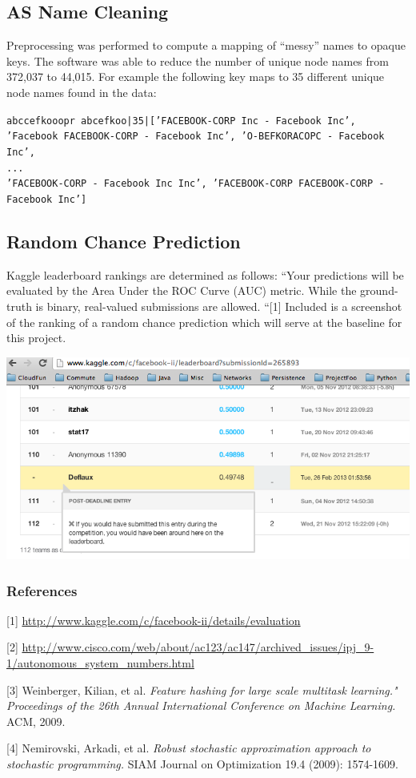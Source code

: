 \documentclass{article} %
\begin{document}
\subsection{AS Name Cleaning}

Preprocessing was performed to compute a mapping of ``messy'' names to opaque
keys.  The software was able to reduce the number of unique node names from
372,037 to 44,015. For example the following key maps to 35 different unique node names
found in the data:

{\small \texttt{abccefkooopr abcefkoo|35|['FACEBOOK-CORP Inc - Facebook
    Inc', 'Facebook FACEBOOK-CORP - Facebook Inc', 'O-BEFKORACOPC - Facebook
    Inc', \\
... \\'FACEBOOK-CORP - Facebook Inc Inc', 'FACEBOOK-CORP FACEBOOK-CORP - Facebook Inc']}}

\subsection{Random Chance Prediction}

Kaggle leaderboard rankings are determined as follows: ``Your predictions
will be evaluated by the Area Under the ROC Curve (AUC) metric.  While the
ground-truth is binary, real-valued submissions are allowed. ``[1]  Included
is a screenshot of the ranking of a random chance prediction which will
serve at the baseline for this project.

  \begin{center}
    \includegraphics[scale=.4]{randomPredictions.png}
  \end{center}

\subsubsection*{References}

\small{
[1] \url{http://www.kaggle.com/c/facebook-ii/details/evaluation}

[2] \url{http://www.cisco.com/web/about/ac123/ac147/archived_issues/ipj_9-1/autonomous_system_numbers.html}

[3] Weinberger, Kilian, et al. {\it Feature hashing for large scale multitask learning." Proceedings of the 26th Annual International Conference on Machine Learning.} ACM, 2009.

[4] Nemirovski, Arkadi, et al. {\it Robust stochastic approximation approach to stochastic programming.} SIAM Journal on Optimization 19.4 (2009): 1574-1609.
}
\end{document}
